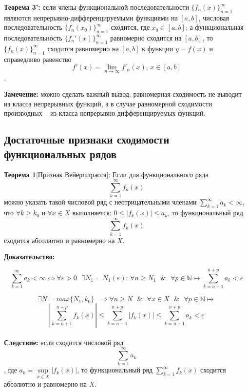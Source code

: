 \documentclass[a4paper,12pt]{article} %
\begin{document}
\noindent \textbf{Теорема 3':} если члены функциональной последовательности $\{f_n(x)\}_{n=1}^\infty$ являются непрерывно-дифференцируемыми функциями на $[a,b]$, числовая последовательность $\{f_n(x_0)\}_{n=1}^\infty$ сходится, где $x_0 \in [a,b]$; а функциональная последовательность $\{f_n'(x)\}_{n=1}^\infty$ равномерно сходится на $[a,b]$, то $\{f_n(x)\}_{n=1}^\infty$ сходится равномерно на $[a,b]$ к функции $y = f(x)$ и справедливо равенство $$f'(x)= \lim_{n\rightarrow \infty} f'_n(x) \text{, }x \in [a,b]$$.

\noindent \textbf{Замечение:} можно сделать важный вывод: равномерная сходимость не выводит из класса непрерывных функций, а в случае равномерной сходимости производных -- из класса непрерывно дифференцируемых функций.

\subsection{Достаточные признаки сходимости функциональных рядов}

\noindent \textbf{Теорема 1}[Признак Вейерштрасса]:
\newline
Если для функционального ряда $$\sum_{k = 1}^{\infty}  f_k(x)$$ можно указать такой числовой ряд с неотрицательными членами $\sum\limits_{k = 1}^{\infty}a_k < \infty$, что $\forall k \geq k_0$ и $\forall x \in X$ выполняется: $0 \leq |f_k(x)| \leq a_k$, то функциональный ряд  $$\sum_{k = 1}^{\infty}  f_k(x)$$ сходится абсолютно и равномерно на $X$.

\noindent \textbf{Доказательство:}

$$\sum_{k = 1}^{\infty}a_k < \infty \Leftrightarrow \forall \varepsilon > 0 \text{ }\exists N_1 = N_1(\varepsilon)\text{: } \forall n \geq N_1 \text{ }\&\text{ } \forall p \in \mathds{N} \longmapsto \sum_{k = n+1}^{n+p}a_k < \varepsilon$$ 

$$\exists N = max\{N_1, k_0\} \text{ } \Rightarrow \forall n \geq N \text{ } \& \text{ } \forall x \in X \text{ } \& \text{ } \forall p \in \mathds{N}\longmapsto$$ $$|\sum_{k = n+1}^{n+p}f_k(x)| \leq \sum_{k = n+1}^{n+p}|f_k(x)| \leq \sum_{k = n+1}^{n+p}a_k < \varepsilon$$
\\[5 mm]
\noindent \textbf{Следствие:} если сходится числовой ряд $$\sum_{k = 1}^{\infty}a_k$$, где $a_k = \sup\limits_{x \in X}|f_k(x)|$, то функциональный ряд $\sum\limits_{k = 1}^{\infty}  f_k(x)$ сходится абсолютно и равномерно на $X$. 
\end{document}
